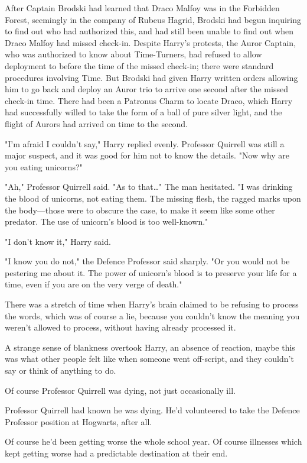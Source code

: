 After Captain Brodski had learned that Draco Malfoy was in the Forbidden
Forest, seemingly in the company of Rubeus Hagrid, Brodski had begun inquiring
to find out who had authorized this, and had still been unable to find out when
Draco Malfoy had missed check-in. Despite Harry's protests, the Auror Captain,
who was authorized to know about Time-Turners, had refused to allow deployment
to before the time of the missed check-in; there were standard procedures
involving Time. But Brodski had given Harry written orders allowing him to go
back and deploy an Auror trio to arrive one second after the missed check-in
time. There had been a Patronus Charm to locate Draco, which Harry had
successfully willed to take the form of a ball of pure silver light, and the
flight of Aurors had arrived on time to the second.

"I'm afraid I couldn't say," Harry replied evenly. Professor Quirrell was still
a major suspect, and it was good for him not to know the details. "Now why are
you eating unicorns?"

"Ah," Professor Quirrell said. "As to that…" The man hesitated. "I was drinking
the blood of unicorns, not eating them. The missing flesh, the ragged marks
upon the body---those were to obscure the case, to make it seem like some other
predator. The use of unicorn's blood is too well-known."

"I don't know it," Harry said.

"I know you do not," the Defence Professor said sharply. "Or you would not be
pestering me about it. The power of unicorn's blood is to preserve your life
for a time, even if you are on the very verge of death."

There was a stretch of time when Harry's brain claimed to be refusing to
process the words, which was of course a lie, because you couldn't know the
meaning you weren't allowed to process, without having already processed it.

A strange sense of blankness overtook Harry, an absence of reaction, maybe this
was what other people felt like when someone went off-script, and they couldn't
say or think of anything to do.

Of course Professor Quirrell was dying, not just occasionally ill.

Professor Quirrell had known he was dying. He'd volunteered to take the Defence
Professor position at Hogwarts, after all.

Of course he'd been getting worse the whole school year. Of course illnesses
which kept getting worse had a predictable destination at their end.


